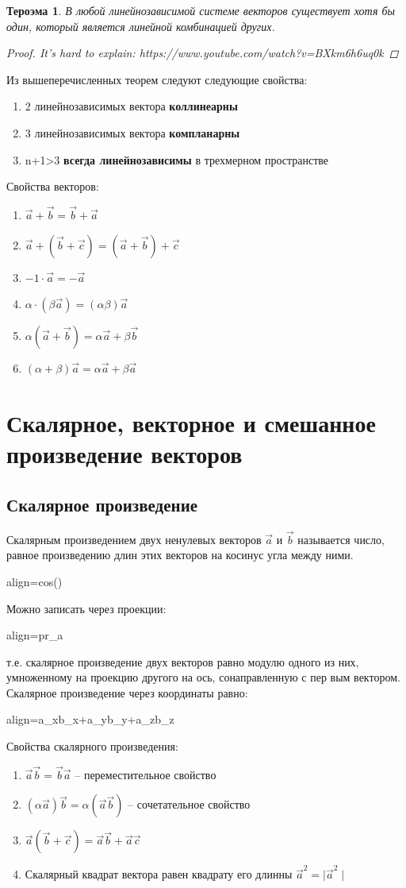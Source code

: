 \documentclass[oneside]{book}
\newcommand{\boxedeq}[2]{\begin{empheq}[box={\fboxsep=6pt\fbox}]{align}\label{#1}#2\end{empheq}}
\newtheorem{thm}{Тероэма}[chapter] %
\begin{document}
\begin{itemize}
\begin{enumerate}
\begin{thm}
  В любой линейнозависимой системе векторов существует хотя бы один, который является линейной комбинацией других.
  \begin{proof}
    It's hard to explain: https://www.youtube.com/watch?v=BXkm6h6uq0k
  \end{proof}
\end{thm}
Из вышеперечисленных теорем следуют следующие свойства:
\begin{enumerate}
  \item 2 линейнозависимых вектора \textbf{коллинеарны}
  \item 3 линейнозависимых вектора \textbf{компланарны} 
  \item n+1>3 \textbf{всегда линейнозависимы} в трехмерном пространстве
  \end{enumerate}
Свойства векторов:
\begin{enumerate}
  \item $\vec{a}+\vec{b}=\vec{b}+\vec{a}$
  \item $\vec{a}+(\vec{b}+\vec{c})=(\vec{a}+\vec{b})+\vec{c}$
  \item $-1\cdot\vec{a}=-\vec{a}$
  \item $\alpha\cdot(\beta\vec{a})=(\alpha\beta)\vec{a}$
  \item $\alpha(\vec{a}+\vec{b})=\alpha\vec{a}+\beta\vec{b}$
  \item $(\alpha+\beta)\vec{a}=\alpha\vec{a}+\beta\vec{a}$
\end{enumerate}

\setcounter{chapter}{41}
\chapter{Скалярное, векторное и смешанное произведение векторов}
\section{Скалярное произведение}
Скалярным произведением двух ненулевых векторов $\vec{a}$ и $\vec{b}$ называется число, равное произведению длин этих векторов на ко­синус угла между ними.
\boxedeq{eq:*}{\cdot{}=\mid\vec{a}\mid\cdot\mid\vec{b}\mid cos(\phi)}
Можно записать через проекции:
\boxedeq{eq:*}{\cdot{}=\mid\vec{a}\mid\cdot pr_{a} \vec{b}}
т.е. скалярное произведение двух векторов равно модулю одного
из
них, умноженному на проекцию другого на ось, сонаправленную с пер­
вым вектором.
Скалярное произведение через координаты равно:
\boxedeq{eq:*}{\cdot{}=a_{x}b_{x}+a_{y}b_{y}+a_{z}b_{z}}
Свойства скалярного произведения:
\begin{enumerate}
  \item $\vec{a}\vec{b}=\vec{b}\vec{a}$ -- переместительное свойство
  \item $(\alpha\vec{a})\vec{b}=\alpha(\vec{a}\vec{b})$ -- сочетательное свойство
  \item $\vec{a}(\vec{b}+\vec{c})=\vec{a}\vec{b}+\vec{a}\vec{c}$
  \item Скалярный квадрат вектора равен квадрату его длинны $\vec{a}^{2}=\mid\vec{a}^{2}\mid$
\end{enumerate}


\end{enumerate}
\end{itemize}
\end{document}
